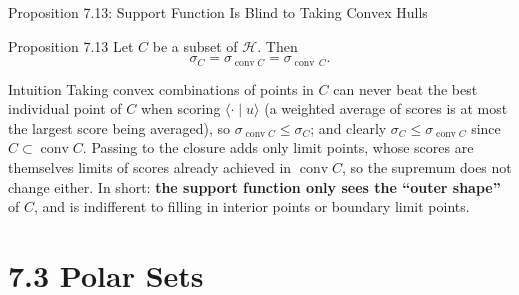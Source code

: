 \documentclass[aspectratio=169,10pt]{beamer}
\DeclareMathOperator{\conv}{conv}
\newcommand{\Hil}{\mathcal{H}}
\newcommand{\ip}[2]{\langle #1 \mid #2 \rangle}
\newcommand{\closure}[1]{\overline{#1}}
\begin{document}
\begin{frame}{Proposition 7.13: Support Function Is Blind to Taking Convex Hulls}

  \begin{block}{Proposition 7.13}
    Let $C$ be a subset of $\Hil$. Then
    \[
      \sigma_C = \sigma_{\conv C} = \sigma_{\closure{\conv}\,C}.
    \]
  \end{block}

  \begin{block}{Intuition}
    Taking convex combinations of points in $C$ can never beat the best
    individual point of $C$ when scoring $\ip{\cdot}{u}$ (a weighted average
    of scores is at most the largest score being averaged), so
    $\sigma_{\conv C} \le \sigma_C$; and clearly $\sigma_C \le
    \sigma_{\conv C}$ since $C \subset \conv C$. Passing to the closure adds
    only limit points, whose scores are themselves limits of scores already
    achieved in $\conv C$, so the supremum does not change either. In short:
    \textbf{the support function only sees the ``outer shape''} of $C$, and
    is indifferent to filling in interior points or boundary limit points.
  \end{block}

\end{frame}

\section{7.3 Polar Sets}
\end{document}
